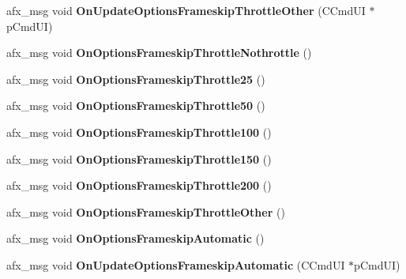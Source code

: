 \begin{DoxyCompactItemize}
\item 
\mbox{\label{class_main_wnd_a3d0b3623cc17e6a1f6855dff9106e737}} 
afx\+\_\+msg void {\bfseries On\+Update\+Options\+Frameskip\+Throttle\+Other} (C\+Cmd\+UI $\ast$p\+Cmd\+UI)
\item 
\mbox{\label{class_main_wnd_a54d38aa98017f7e37c6b8938a480b9ce}} 
afx\+\_\+msg void {\bfseries On\+Options\+Frameskip\+Throttle\+Nothrottle} ()
\item 
\mbox{\label{class_main_wnd_aabf5abcedfd47af722f1c42e8363b568}} 
afx\+\_\+msg void {\bfseries On\+Options\+Frameskip\+Throttle25} ()
\item 
\mbox{\label{class_main_wnd_a40d884dcce34c24b6fa501f8e056af46}} 
afx\+\_\+msg void {\bfseries On\+Options\+Frameskip\+Throttle50} ()
\item 
\mbox{\label{class_main_wnd_aa16e562b5f9e456543112253588f57be}} 
afx\+\_\+msg void {\bfseries On\+Options\+Frameskip\+Throttle100} ()
\item 
\mbox{\label{class_main_wnd_a39292c20b9a0cddfbd60d5230bbe0b3e}} 
afx\+\_\+msg void {\bfseries On\+Options\+Frameskip\+Throttle150} ()
\item 
\mbox{\label{class_main_wnd_a989cf9b90b96b67c9c016cd3652d2e6e}} 
afx\+\_\+msg void {\bfseries On\+Options\+Frameskip\+Throttle200} ()
\item 
\mbox{\label{class_main_wnd_ae29a4d47a221049a8fbdc820ea6fffa9}} 
afx\+\_\+msg void {\bfseries On\+Options\+Frameskip\+Throttle\+Other} ()
\item 
\mbox{\label{class_main_wnd_aafb7bdce8ddf0dbe3420c1f5fcd9fd62}} 
afx\+\_\+msg void {\bfseries On\+Options\+Frameskip\+Automatic} ()
\item 
\mbox{\label{class_main_wnd_ae5649490db983b067dbb0827ce64b14c}} 
afx\+\_\+msg void {\bfseries On\+Update\+Options\+Frameskip\+Automatic} (C\+Cmd\+UI $\ast$p\+Cmd\+UI)
\item 
\mbox{\label{class_main_wnd_a81fdf41b0bef9ec1cef244c686c5d740}} 

\end{DoxyCompactItemize}
